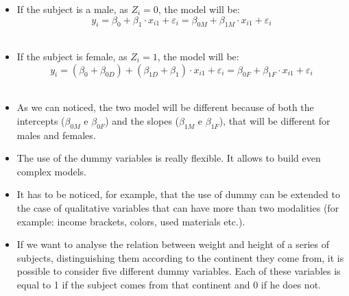 \begin{frame}
  \vspace*{.25cm}
  \begin{itemize}
    \item If the subject is a male, as  $ Z_i=0 $, the model will be:
      \vspace{-0.25cm} $$ y_i = \beta_0 + \beta_1 \cdot x_{i1} + \varepsilon_i = \beta_{0M} + \beta_{1M} \cdot x_{i1} + \varepsilon_i $$ \\
    \vspace{0.25cm}
    \item If the subject is female, as $ Z_i=1 $, the model will be:
      \vspace{-0.5cm} $$ y_i= (\beta_0 + \beta_{0D}) + (\beta_{1D} + \beta_1) \cdot x_{i1} + \varepsilon_i = \beta_{0F} + \beta_{1F} \cdot x_{i1} + \varepsilon_i $$ \\
    \vspace{0.25cm}
    \item As we can noticed, the two model will be different because of both the intercepts ($ \beta_{0M} $ e $ \beta_{0F} $) and the slopes ($ \beta_{1M} $ e $ \beta_{1F} $), that will be different for males and females.
  \end{itemize}
\end{frame}


\begin{frame}
  \vspace{0.25cm}
  \begin{itemize}
    \item The use of the dummy variables is really flexible. It allows to build even complex models.
    \vspace{0.25cm}
    \item It has to be noticed, for example, that the use of dummy can be extended to the case of qualitative variables that can have more than two modalities (for example: income brackets, colors, used materials etc.).
    \vspace{0.25cm}
    \item If we want to analyse the relation between weight and height of a series of subjects, distinguishing them according to the continent they come from, it is possible to consider five different dummy variables. Each of these variables is equal to 1 if the subject comes from that continent and 0 if he does not. 
  \end{itemize}
\end{frame}


